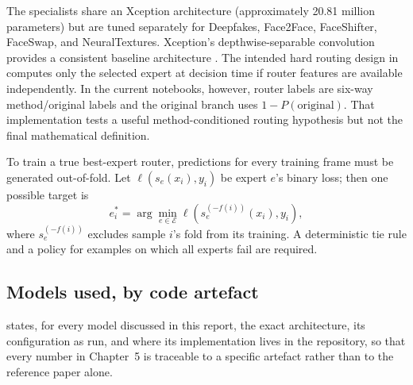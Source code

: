 The specialists share an Xception architecture (approximately 20.81 million
parameters) but are tuned separately for Deepfakes, Face2Face, FaceShifter,
FaceSwap, and NeuralTextures. Xception's depthwise-separable convolution provides
a consistent baseline architecture \cite{chollet2017xception}. The intended hard
routing design in  computes only the selected expert at
decision time if router features are available independently. In the current
notebooks, however, router labels are six-way method/original labels and the
original branch uses $1-P(\mathrm{original})$. That implementation tests a useful
method-conditioned routing hypothesis but not the final mathematical definition.

To train a true best-expert router, predictions for every training frame must be
generated out-of-fold. Let $\ell(s_e(x_i),y_i)$ be expert $e$'s binary loss; then
one possible target is
\begin{equation}
  e_i^*=\arg\min_{e\in\mathcal E}\ell(s_e^{(-f(i))}(x_i),y_i),
\end{equation}
where $s_e^{(-f(i))}$ excludes sample $i$'s fold from its training. A deterministic
tie rule and a policy for examples on which all experts fail are required.

\subsection{Models used, by code artefact}

 states, for every model discussed in this report, the
exact architecture, its configuration as run, and where its implementation
lives in the repository, so that every number in Chapter~5 is traceable to a
specific artefact rather than to the reference paper alone.

